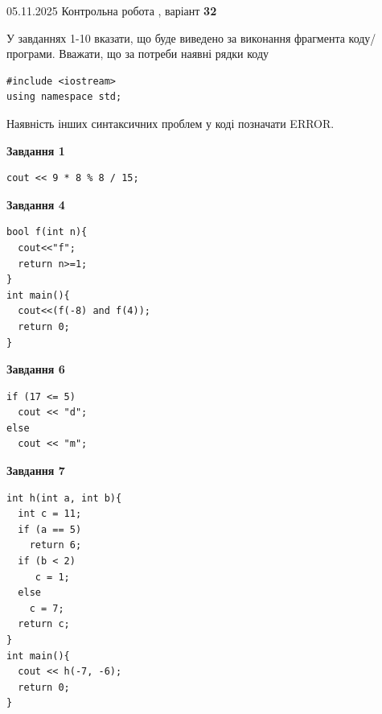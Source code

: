\documentclass[12pt, ukrainian]{article}
\begin{document}
\newpage

{\Large{05.11.2025 Контрольна робота , варіант  \No \textbf { 32 }\par}}
{
\begin {large}
У завданнях 1-10 вказати, що буде виведено за виконання фрагмента коду/про\-гра\-ми.
Вважати, що за потреби наявні рядки коду
\begin{verbatim}
#include <iostream>
using namespace std;
\end{verbatim}
Наявність інших синтаксичних проблем у коді позначати ERROR.

\begin{minipage}[t]{7.0cm}

\begin{center}
\textbf{Завдання 1}
\end{center}
\vspace{-8mm}

\begin{verbatim}
cout << 9 * 8 % 8 / 15;
\end{verbatim}



\begin{center}
\textbf{Завдання 4}
\end{center}
\vspace{-8mm}

\begin{verbatim}
bool f(int n){
  cout<<"f";
  return n>=1;
}
int main(){
  cout<<(f(-8) and f(4));
  return 0;
}
\end{verbatim}



\begin{center}
\textbf{Завдання 6}
\end{center}
\vspace{-8mm}

\begin{verbatim}
if (17 <= 5)
  cout << "d";
else
  cout << "m";
\end{verbatim}



\begin{center}
\textbf{Завдання 7}
\end{center}
\vspace{-8mm}

\begin{verbatim}
int h(int a, int b){
  int c = 11;
  if (a == 5)
    return 6;
  if (b < 2)
     c = 1;
  else
    c = 7;
  return c;
}
int main(){
  cout << h(-7, -6);
  return 0;
}
\end{verbatim}


\end{minipage}
\end{large}}
\end{document}
